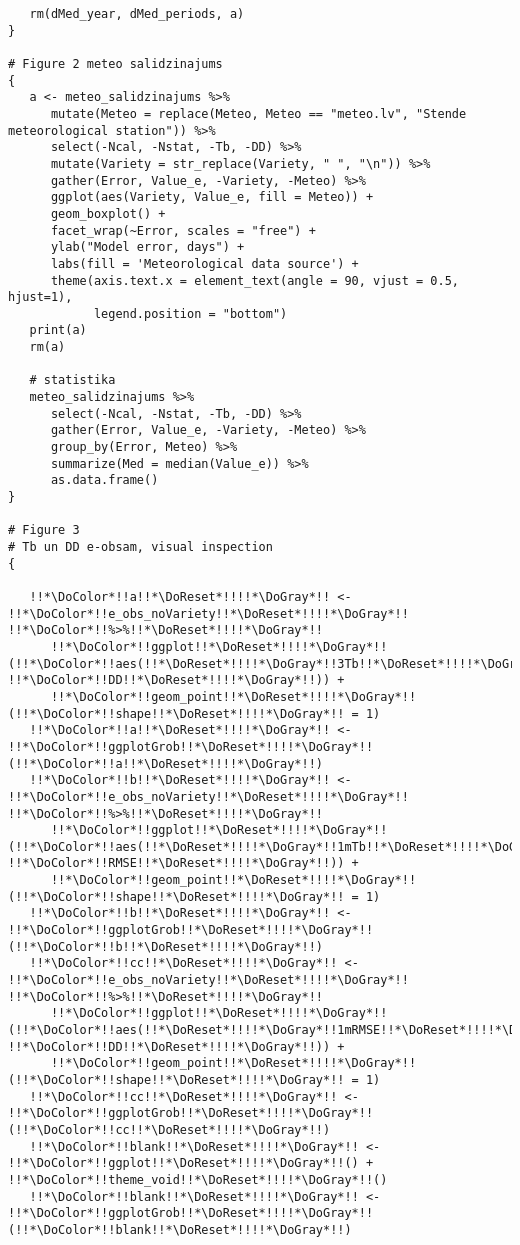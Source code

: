 \begin{verbatim}
   rm(dMed_year, dMed_periods, a)
}

# Figure 2 meteo salidzinajums
{
   a <- meteo_salidzinajums %>%
      mutate(Meteo = replace(Meteo, Meteo == "meteo.lv", "Stende meteorological station")) %>%
      select(-Ncal, -Nstat, -Tb, -DD) %>%
      mutate(Variety = str_replace(Variety, " ", "\n")) %>%
      gather(Error, Value_e, -Variety, -Meteo) %>%
      ggplot(aes(Variety, Value_e, fill = Meteo)) +
      geom_boxplot() +
      facet_wrap(~Error, scales = "free") +
      ylab("Model error, days") +
      labs(fill = 'Meteorological data source') +
      theme(axis.text.x = element_text(angle = 90, vjust = 0.5, hjust=1),
            legend.position = "bottom")
   print(a)
   rm(a)

   # statistika
   meteo_salidzinajums %>%
      select(-Ncal, -Nstat, -Tb, -DD) %>%
      gather(Error, Value_e, -Variety, -Meteo) %>%
      group_by(Error, Meteo) %>%
      summarize(Med = median(Value_e)) %>%
      as.data.frame()
}

# Figure 3
# Tb un DD e-obsam, visual inspection
{

   !!*\DoColor*!!a!!*\DoReset*!!!!*\DoGray*!! <- !!*\DoColor*!!e_obs_noVariety!!*\DoReset*!!!!*\DoGray*!! !!*\DoColor*!!%>%!!*\DoReset*!!!!*\DoGray*!!
      !!*\DoColor*!!ggplot!!*\DoReset*!!!!*\DoGray*!!(!!*\DoColor*!!aes(!!*\DoReset*!!!!*\DoGray*!!3Tb!!*\DoReset*!!!!*\DoGray*!!, !!*\DoColor*!!DD!!*\DoReset*!!!!*\DoGray*!!)) +
      !!*\DoColor*!!geom_point!!*\DoReset*!!!!*\DoGray*!!(!!*\DoColor*!!shape!!*\DoReset*!!!!*\DoGray*!! = 1)
   !!*\DoColor*!!a!!*\DoReset*!!!!*\DoGray*!! <- !!*\DoColor*!!ggplotGrob!!*\DoReset*!!!!*\DoGray*!!(!!*\DoColor*!!a!!*\DoReset*!!!!*\DoGray*!!)
   !!*\DoColor*!!b!!*\DoReset*!!!!*\DoGray*!! <- !!*\DoColor*!!e_obs_noVariety!!*\DoReset*!!!!*\DoGray*!! !!*\DoColor*!!%>%!!*\DoReset*!!!!*\DoGray*!!
      !!*\DoColor*!!ggplot!!*\DoReset*!!!!*\DoGray*!!(!!*\DoColor*!!aes(!!*\DoReset*!!!!*\DoGray*!!1mTb!!*\DoReset*!!!!*\DoGray*!!, !!*\DoColor*!!RMSE!!*\DoReset*!!!!*\DoGray*!!)) +
      !!*\DoColor*!!geom_point!!*\DoReset*!!!!*\DoGray*!!(!!*\DoColor*!!shape!!*\DoReset*!!!!*\DoGray*!! = 1)
   !!*\DoColor*!!b!!*\DoReset*!!!!*\DoGray*!! <- !!*\DoColor*!!ggplotGrob!!*\DoReset*!!!!*\DoGray*!!(!!*\DoColor*!!b!!*\DoReset*!!!!*\DoGray*!!)
   !!*\DoColor*!!cc!!*\DoReset*!!!!*\DoGray*!! <- !!*\DoColor*!!e_obs_noVariety!!*\DoReset*!!!!*\DoGray*!! !!*\DoColor*!!%>%!!*\DoReset*!!!!*\DoGray*!!
      !!*\DoColor*!!ggplot!!*\DoReset*!!!!*\DoGray*!!(!!*\DoColor*!!aes(!!*\DoReset*!!!!*\DoGray*!!1mRMSE!!*\DoReset*!!!!*\DoGray*!!, !!*\DoColor*!!DD!!*\DoReset*!!!!*\DoGray*!!)) +
      !!*\DoColor*!!geom_point!!*\DoReset*!!!!*\DoGray*!!(!!*\DoColor*!!shape!!*\DoReset*!!!!*\DoGray*!! = 1)
   !!*\DoColor*!!cc!!*\DoReset*!!!!*\DoGray*!! <- !!*\DoColor*!!ggplotGrob!!*\DoReset*!!!!*\DoGray*!!(!!*\DoColor*!!cc!!*\DoReset*!!!!*\DoGray*!!)
   !!*\DoColor*!!blank!!*\DoReset*!!!!*\DoGray*!! <- !!*\DoColor*!!ggplot!!*\DoReset*!!!!*\DoGray*!!() + !!*\DoColor*!!theme_void!!*\DoReset*!!!!*\DoGray*!!()
   !!*\DoColor*!!blank!!*\DoReset*!!!!*\DoGray*!! <- !!*\DoColor*!!ggplotGrob!!*\DoReset*!!!!*\DoGray*!!(!!*\DoColor*!!blank!!*\DoReset*!!!!*\DoGray*!!)



\end{verbatim}
